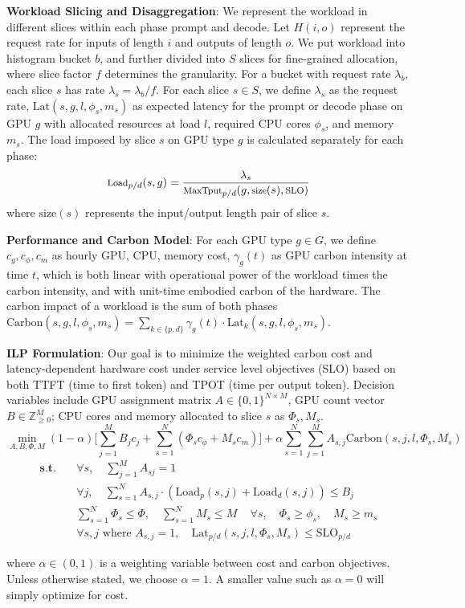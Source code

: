 \textbf{Workload Slicing and Disaggregation}: We represent the workload in different slices within each phase {prompt} and {decode}. Let \( H(i,o) \) represent the request rate for inputs of length \( i \) and outputs of length \( o \). We put workload into histogram bucket \( b \), and further divided into \( S \) slices for fine-grained allocation, where slice factor \( f \) determines the granularity. For a bucket with request rate \( \lambda_b \), each slice \( s \) has rate \( \lambda_s = \lambda_b / f \). For each slice \( s \in S \), we define $\lambda_s$ as the request rate, $\text{Lat}(s,g,l, \phi_s,m_s)$ as expected latency for the prompt or decode phase on GPU \( g \) with allocated resources at load \( l \), required CPU cores \( \phi_s \), and memory \( m_s \). The load imposed by slice \( s \) on GPU type \( g \) is calculated separately for each phase:
\[\footnotesize
\text{Load}_{p/d}(s,g) = \frac{\lambda_s}{\text{MaxTput}_{p/d}(g,\text{size}(s),\text{SLO})}
\]
where \( \text{size}(s) \) represents the input/output length pair of slice \( s \).

\textbf{Performance and Carbon Model}: For each GPU type \( g \in G \), we define \( c_g,  c_\phi, c_m \) as hourly GPU, CPU, memory cost, \( \gamma_g(t) \) as GPU carbon intensity at time \( t \), which is both linear with operational power of the workload times the carbon intensity, and with unit-time embodied carbon of the hardware.
The carbon impact of a workload is the sum of both phases $\text{Carbon}(s,g,l, \phi_s,m_s) = \sum_{k \in \{p,d\}} \gamma_g(t) \cdot \text{Lat}_{k}(s,g,l,\phi_s,m_s)$. 




\textbf{ILP Formulation}: Our goal is to minimize the weighted carbon cost and latency-dependent hardware cost under service level objectives (SLO) based on both TTFT (time to first token) and TPOT (time per output token). Decision variables include GPU assignment matrix \( A \in \{0,1\}^{N \times M} \), GPU count vector \( B \in \mathbb{Z}_{\geq 0}^M \); CPU cores and memory allocated to slice \( s \) as \( \Phi_s, M_s  \).
\label{sec:optimization}
{\footnotesize
\[
\min_{A,B,\Phi,M} (1-\alpha) \Big[\sum_{j=1}^M B_j c_j + \sum_{s=1}^{N} (\Phi_s c_\phi + M_s c_m) \Big] + \alpha \sum_{s=1}^N \sum_{j=1}^M A_{s,j} \text{Carbon}(s,j,l, \Phi_s,M_s)
\]
\vspace{-2.em}
\begin{align*} 
\textbf{s.t.}\quad & \forall s, \quad \sum_{j=1}^M A_{sj} = 1 \\
& \forall j, \quad \sum_{s=1}^N A_{s,j} \cdot (\text{Load}_{p}(s,j) + \text{Load}_{d}(s,j)) \leq B_j \\
& \sum_{s=1}^N \Phi_s \leq \Phi, \quad \sum_{s=1}^N M_s \leq M \, \quad \forall s, \quad \Phi_s \geq \phi_s, \quad M_s \geq m_s \\
& \forall s,j \text{ where } A_{s,j} = 1, \quad \text{Lat}_{p/d}(s,j,l, \Phi_s,M_s) \leq \text{SLO}_{p/d}
\end{align*}
}\vspace{-2em}

where $\alpha \in (0,1)$ is a weighting variable between cost and carbon objectives. Unless otherwise stated, we choose $\alpha = 1$. A smaller value such as $\alpha = 0$ will simply optimize for cost. 
